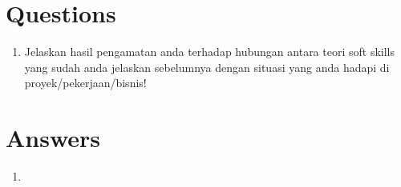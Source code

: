 \documentclass[12pt, letterpaper]{article}
\begin{document}
\section*{Questions}
\begin{enumerate}
    \item Jelaskan hasil pengamatan anda terhadap hubungan antara teori soft skills yang sudah anda jelaskan sebelumnya dengan situasi yang anda hadapi di proyek/pekerjaan/bisnis! 
\end{enumerate}

\section*{Answers}
\begin{enumerate}
    \item
\end{enumerate}
\end{document}
